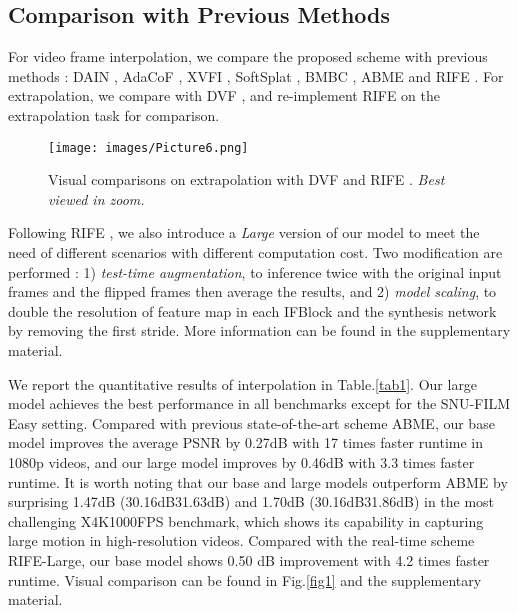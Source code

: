 \documentclass[sigconf]{acmart}
\begin{document}
\subsection{Comparison with Previous Methods}
\label{sec:4-3}


For video frame interpolation, we compare the proposed scheme with previous methods : DAIN \cite{bao2019depth}, AdaCoF \cite{lee2020adacof}, XVFI \cite{sim2021xvfi}, SoftSplat \cite{niklaus2020softmax}, BMBC \cite{park2020bmbc}, ABME \cite{park2021asymmetric} and RIFE \cite{huang2020rife}. For extrapolation, we compare with DVF \cite{liu2017video}, and re-implement RIFE on the extrapolation task for comparison. 

\begin{figure}[h]
    \texttt{[image: images/Picture6.png]}
    \caption{Visual comparisons on extrapolation with DVF \cite{liu2017video} and RIFE \cite{huang2020rife}. \textit{Best viewed in zoom.}}
    \label{fig6}
\end{figure}

Following RIFE \cite{huang2020rife}, we also introduce a \textit{Large} version of our model to meet the need of different scenarios with different computation cost. Two modification are performed : 1) \textit{test-time augmentation}, to inference twice with the original input frames and the flipped frames then average the results, and 2) \textit{model scaling}, to double the resolution of feature map in each IFBlock and the synthesis network by removing the first stride. More information can be found in the supplementary material.


We report the quantitative results of interpolation in Table.\ref{tab1}. Our large model achieves the best performance in all benchmarks except for the SNU-FILM Easy setting. Compared with previous state-of-the-art scheme ABME, our base model improves the average PSNR by 0.27dB with 17 times faster runtime in 1080p videos, and our large model improves by 0.46dB with 3.3 times faster runtime. It is worth noting that our base and large models outperform ABME by surprising 1.47dB (30.16dB31.63dB) and 1.70dB (30.16dB31.86dB) in the most challenging X4K1000FPS benchmark, which shows its capability in capturing large motion in high-resolution videos. Compared with the real-time scheme RIFE-Large, our base model shows 0.50 dB improvement with 4.2 times faster runtime. Visual comparison can be found in Fig.\ref{fig1} and the supplementary material.
\end{document}
